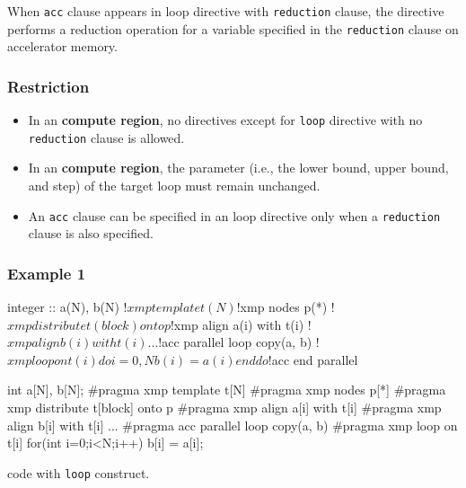 When {\tt acc} clause appears in {\XMP} loop directive with {\tt reduction} clause,
the directive performs a reduction operation for a variable specified in
the {\tt reduction} clause on accelerator memory.

\subsubsection*{Restriction}

\begin{itemize}
\item In an {\OACC} {\bf compute region}, no \XMP directives except for
	  {\tt loop} directive with no {\tt reduction} clause is allowed.
\item In an {\OACC} {\bf compute region}, the parameter (i.e., the lower
	  bound, upper bound, and step) of the target loop must
	  remain unchanged.
\item An {\tt acc} clause can be specified in an {\XMP} loop directive 
	  only when a {\tt reduction} clause is also specified.
\end{itemize}

\subsubsection*{Example 1}

\begin{myfigure}
\begin{minipage}{0.45\hsize}
\begin{center}
\begin{XACCFexampleL}
integer :: a(N), b(N)
!$xmp template t(N)
!$xmp nodes p(*)
!$xmp distribute t(block) onto p
!$xmp align a(i) with t(i)
!$xmp align b(i) with t(i)
...
!$acc parallel loop copy(a, b)
!$xmp loop on t(i)
do i=0, N
  b(i) = a(i)
end do
!$acc end parallel
\end{XACCFexampleL}
\end{center}
\end{minipage}
%
\begin{minipage}{0.53\hsize}
\begin{center}
\begin{XACCCexampleR}
int a[N], b[N];
#pragma xmp template t[N]
#pragma xmp nodes p[*]
#pragma xmp distribute t[block] onto p
#pragma xmp align a[i] with t[i]
#pragma xmp align b[i] with t[i]
...
#pragma acc parallel loop copy(a, b)
#pragma xmp loop on t[i]
for(int i=0;i<N;i++){
  b[i] = a[i];
}

\end{XACCCexampleR}
\end{center}
\end{minipage}
\caption{\XACC code with {\OACC} {\tt loop} construct.}\label{code:ex-oacc-loop}
\end{myfigure}

